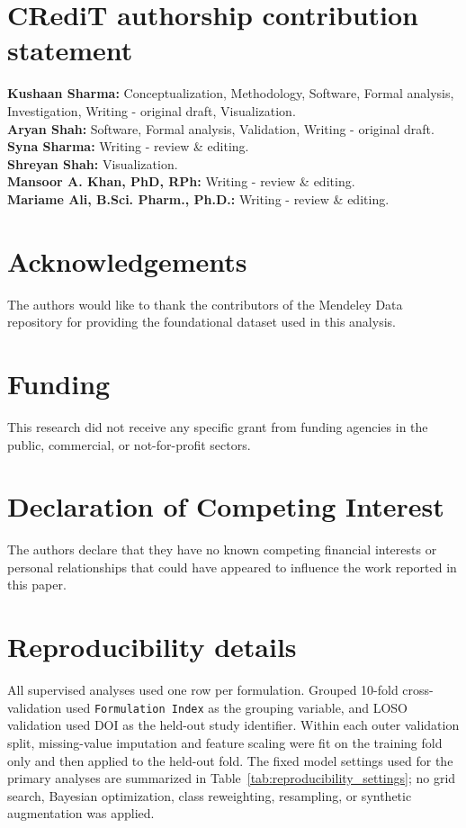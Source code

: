 \documentclass[preprint,12pt,authoryear]{elsarticle}
\begin{document}
\section*{CRediT authorship contribution statement}
\textbf{Kushaan Sharma:} Conceptualization, Methodology, Software, Formal analysis, Investigation, Writing - original draft, Visualization. \\
\textbf{Aryan Shah:} Software, Formal analysis, Validation, Writing - original draft. \\
\textbf{Syna Sharma:} Writing - review \& editing. \\
\textbf{Shreyan Shah:} Visualization. \\
\textbf{Mansoor A. Khan, PhD, RPh:} Writing - review \& editing. \\
\textbf{Mariame Ali, B.Sci. Pharm., Ph.D.:} Writing - review \& editing. \\


\section*{Acknowledgements}
The authors would like to thank the contributors of the Mendeley Data repository for providing the foundational dataset used in this analysis. 

\section*{Funding}
This research did not receive any specific grant from funding agencies in the public, commercial, or not-for-profit sectors. 

\section*{Declaration of Competing Interest}
The authors declare that they have no known competing financial interests or personal relationships that could have appeared to influence the work reported in this paper.

\section*{Reproducibility details}
All supervised analyses used one row per formulation. Grouped 10-fold cross-validation used \texttt{Formulation Index} as the grouping variable, and LOSO validation used DOI as the held-out study identifier. Within each outer validation split, missing-value imputation and feature scaling were fit on the training fold only and then applied to the held-out fold. The fixed model settings used for the primary analyses are summarized in Table~\ref{tab:reproducibility_settings}; no grid search, Bayesian optimization, class reweighting, resampling, or synthetic augmentation was applied.
\end{document}

